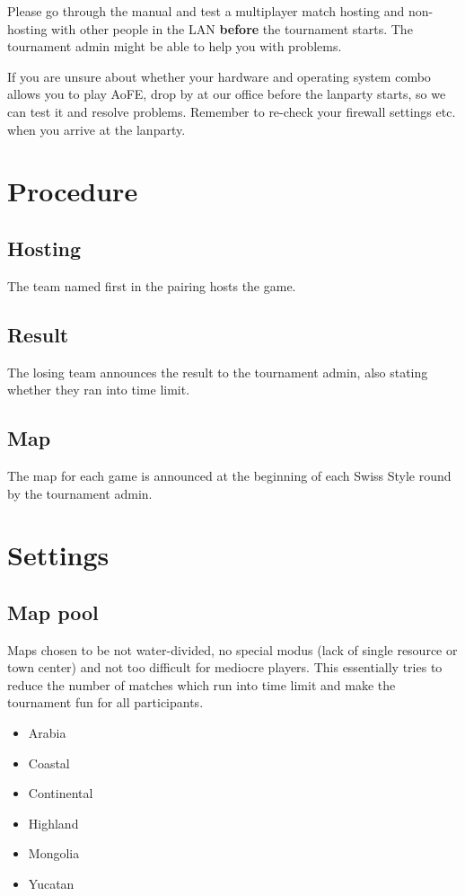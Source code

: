 \documentclass{article}
\begin{document}
Please go through the manual and test a multiplayer match hosting and non-hosting with other people in the LAN \textbf{before} the tournament starts. The tournament admin might be able to help you with problems.

If you are unsure about whether your hardware and operating system combo allows you to play AoFE, drop by at our office before the lanparty starts, so we can test it and resolve problems. Remember to re-check your firewall settings etc. when you arrive at the lanparty.

\section{Procedure}
\subsection{Hosting}
The team named first in the pairing hosts the game.
\subsection{Result}
The losing team announces the result to the tournament admin, also stating whether they ran into time limit.
\subsection{Map}
The map for each game is announced at the beginning of each Swiss Style round by the tournament admin.

\newpage

\section{Settings}
\subsection{Map pool}
Maps chosen to be not water-divided, no special modus (lack of single resource or town center) and not too difficult for mediocre players. This essentially tries to reduce the number of matches which run into time limit and make the tournament fun for all participants.
\begin{itemize}
\item Arabia
\item Coastal
\item Continental
\item Highland
\item Mongolia
\item Yucatan
\end{itemize}
\end{document}
